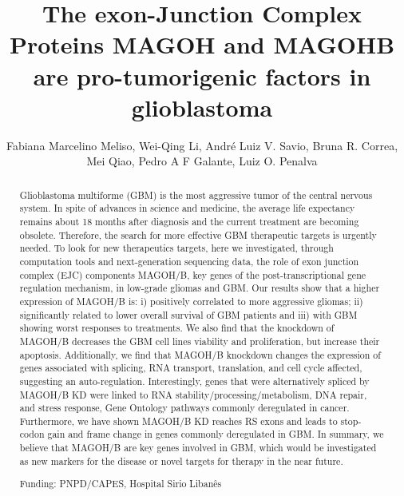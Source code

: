 \documentclass[twoside]{article}
\title{\vspace{-15mm}\fontsize{24pt}{10pt}\selectfont\textbf{ The exon-Junction Complex Proteins MAGOH and MAGOHB are pro-tumorigenic factors in glioblastoma }} %
\author{ Fabiana Marcelino Meliso, Wei-Qing Li, Andr\'e Luiz V. Savio, Bruna R. Correa, Mei Qiao, Pedro A F Galante, Luiz O. Penalva }
\affil{ Hospital Sirio Liban\^es }
\date{}
\begin{document}
  
  
  \maketitle %
  
  
  \thispagestyle{fancy} %
  
  
  \begin{abstract}
  Glioblastoma multiforme (GBM) is the most aggressive tumor of the central nervous system. In spite of advances in science and medicine,  the average life expectancy remains about 18 months after diagnosis and the current treatment are becoming obsolete. Therefore,  the search for more effective GBM therapeutic targets is urgently needed. To look for new therapeutics targets,  here we investigated,  through computation tools and next-generation sequencing data,  the role of exon junction complex (EJC) components MAGOH/B,  key genes of the post-transcriptional gene regulation mechanism,  in low-grade gliomas and GBM. Our results show that a higher expression of MAGOH/B is: i) positively correlated to more aggressive gliomas; ii) significantly related to lower overall survival of GBM patients and iii) with GBM showing worst responses to treatments. We also find that the knockdown of MAGOH/B decreases the GBM cell lines viability and proliferation,  but increase their apoptosis. Additionally,  we find that MAGOH/B knockdown changes the expression of genes associated with splicing,  RNA transport,  translation,  and cell cycle affected,  suggesting an auto-regulation. Interestingly,  genes that were alternatively spliced by MAGOH/B  KD  were  linked to  RNA  stability/processing/metabolism,   DNA  repair,  and stress response,  Gene Ontology  pathways commonly deregulated in cancer. Furthermore,  we have shown MAGOH/B KD reaches RS exons and leads to stop-codon gain and frame change in genes commonly deregulated in GBM. In summary,  we believe that MAGOH/B are key genes involved in GBM,  which would be investigated as new markers for the disease or novel targets for therapy in the near future.
  
  Funding: PNPD/CAPES,  Hospital Sirio Liban\^es \\ 
  \end{abstract}
  
\end{document}
